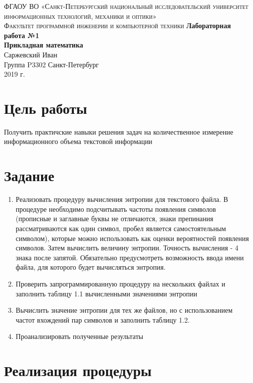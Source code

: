 \documentclass[12pt, a4paper]{article}
\begin{document}
\begin{titlepage}
\begin{center}

\textsc{ФГАОУ ВО «Санкт-Петербургский национальный исследовательский университет информационных технологий, механики и оптики»\\[4mm]
Факультет программной инженерии и компьютерной техники}
\vfill
\textbf{Лабораторная работа №1\\[4mm]
Прикладная математика\\[16mm]
}
Саржевский Иван
\\[2mm]Группа P3302
\vfill
Санкт-Петербург\\[2mm]
2019 г.

\end{center}
\end{titlepage}

\section*{Цель работы}
Получить практичские навыки решения задач на количественное измерение
информационного объема текстовой информации

\section*{Задание}
\begin{enumerate}
  \item Реализовать процедуру вычисления энтропии для текстового файла. В
    процедуре необходимо подсчитывать частоты появления символов (прописные и
    заглавные буквы не отличаются, знаки препинания рассматриваются как один
    символ, пробел является самостоятельным символом), которые можно использовать
    как оценки вероятностей появления символов. Затем вычислить величину энтропии.
    Точность вычисления - 4 знака после запятой. Обязательно предусмотреть
    возможность ввода имени файла, для которого будет вычисляться энтропия.
  \item Проверить запрограммированную процедуру на нескольких файлах и заполнить
    таблицу 1.1 вычисленными значениями энтропии
  \item Вычислить значение энтропии для тех же файлов, но с использованием
    частот вхождений пар символов и заполнить таблицу 1.2.
  \item Проанализировать полученные результаты
\end{enumerate}

\section*{Реализация процедуры}

\end{document}
